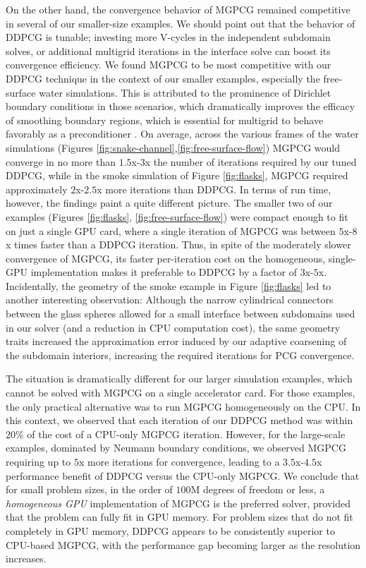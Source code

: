 On the other hand, the convergence behavior of MGPCG remained competitive in several of our smaller-size examples. We should point out that the behavior of DDPCG is tunable;
investing more V-cycles in the independent subdomain solves, or additional multigrid iterations in the interface solve can boost its convergence efficiency. We found MGPCG to be
most competitive with our DDPCG technique in the context of our smaller examples, especially the free-surface water simulations. This is attributed to the prominence of Dirichlet
boundary conditions in those scenarios, which dramatically improves the efficacy of smoothing boundary regions, which is essential for multigrid to behave favorably as a
preconditioner \cite{mcadams2010parallel}. On average, across the various frames of the water simulations (Figures
\ref{fig:snake-channel},\ref{fig:free-surface-flow}) MGPCG would converge in no more than $1.5$x-$3$x the number of iterations required by our tuned DDPCG, while in the smoke
simulation of Figure \ref{fig:flasks}, MGPCG required approximately $2$x-$2.5$x more iterations than DDPCG. In terms of run time, however, the findings paint a quite different
picture. The smaller two of our examples (Figures \ref{fig:flasks}, \ref{fig:free-surface-flow}) were compact enough to fit on just a single GPU card, where a single iteration of MGPCG
was between $5$x-$8$x times faster than a DDPCG iteration. Thus, in spite of the moderately slower convergence of MGPCG, its faster per-iteration cost on the homogeneous,
single-GPU implementation makes it preferable to DDPCG by a factor of $3$x-$5$x. Incidentally, the geometry of the smoke example in Figure \ref{fig:flasks} led to another
interesting observation: Although the narrow cylindrical connectors between the glass spheres allowed for a small interface between subdomains used in our solver (and a
reduction in CPU computation cost), the same geometry traits increased the approximation error induced by our adaptive coarsening of the subdomain interiors, increasing the
required iterations for PCG convergence.

The situation is dramatically different for our larger simulation examples, which cannot be solved with MGPCG on a single accelerator card. For those examples, the only practical
alternative was to run MGPCG homogeneously on the CPU. In this context, we observed that each iteration of our DDPCG method was within $20\%$ of the cost of a CPU-only MGPCG
iteration. However, for the large-scale examples, dominated by Neumann boundary conditions, we observed MGPCG requiring up to $5$x more iterations for convergence, leading to a
$3.5$x-$4.5$x performance benefit of DDPCG versus the CPU-only MGPCG. We conclude that for small problem sizes, in the order of $100$M degrees of freedom or less, a
\emph{homogeneous GPU} implementation of MGPCG is the preferred solver, provided that the problem can fully fit in GPU memory. For problem sizes that do not fit completely in GPU
memory, DDPCG appears to be consistently superior to CPU-based MGPCG, with the performance gap becoming larger as the resolution increases.

